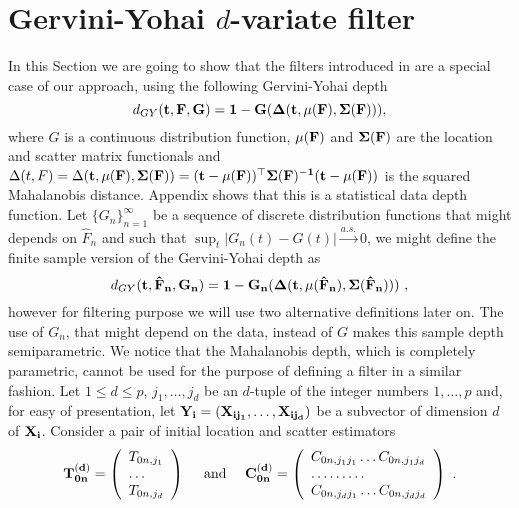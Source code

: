 \documentclass[a4paper,12pt]{article}
\begin{document}
\section{Gervini-Yohai $d$-variate filter}
In this Section we are going to show that the filters introduced in  are a special case of our approach, using the following Gervini-Yohai depth
\begin{equation*}
d_{GY}(\bf{t}, F, G) = 1 - G(\Delta(\bf{t},\bf{\mu}(F),\bf{\Sigma}(F))) ,
\end{equation*}
where $G$ is a continuous distribution function, $\bf{\mu}(F)$ and $\bf{\Sigma}(F)$ are the location and scatter matrix functionals and $\Delta(t, F) = \Delta(\bf{t}, \bf{\mu}(F), \bf{\Sigma}(F)) = (\bf{t} - \bf{\mu}(F))^\top \bf{\Sigma}(F)^{-1} (\bf{t} - \bf{\mu}(F))$ is the squared Mahalanobis distance. Appendix  shows that this is a statistical data depth function. Let $\{ G_n \}_{n=1}^\infty$ be a sequence of discrete distribution functions that might depends on $\hat{F}_n$ and such that $\sup_{t} |G_n(t) - G(t)| \stackrel{a.s.}{\rightarrow} 0$, we might define the finite sample version of the Gervini-Yohai depth as
\begin{equation*}
d_{GY}(\bf{t}, \hat{F}_n, G_n) = 1 - G_n(\Delta(\bf{t},\bf{\mu}(\hat{F}_n),\bf{\Sigma}(\hat{F}_n))) \ ,
\end{equation*}
however for filtering purpose we will use two alternative definitions later on.
The use of $G_n$, that might depend on the data, instead of $G$ makes this sample depth semiparametric. We notice that the Mahalanobis depth, which is completely parametric, cannot be used for the purpose of defining a filter in a similar fashion.
Let $1 \le d \le p$, $j_1, \ldots, j_d$ be an $d$-tuple of the integer numbers $1, \ldots, p$ and, for easy of presentation, let $\bf{Y}_i = (X_{ij_1}, \ldots , X_{ij_d})$ be a subvector of dimension $d$ of $\bf{X}_i$. Consider a pair of initial location and scatter estimators
\begin{equation*}
 \bf{T}_{0n}^{(d)} =  \left (
				\begin{array}{ll}
				T_{0n,j_1} \\
 				\ldots \\
				T_{0n,j_d}
				\end{array}
			\right )
			\quad \mbox{ and } \quad 
        \bf{C}_{0n}^{(d)} =  \left (
				\begin{array}{lll}
				C_{0n,j_1j_1}  \ldots    C_{0n,j_1j_d} \\
 				\ldots             \ldots       \ldots            \\
				C_{0n,j_dj_1} \ldots     C_{0n,j_dj_d}
				\end{array}
			\right ) \ .
\end{equation*}
\end{document}
